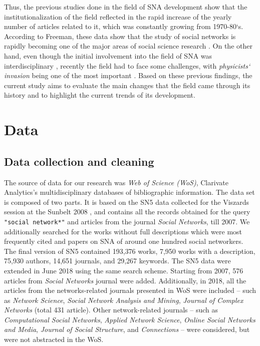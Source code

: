 \documentclass[11pt]{article} %
\begin{document}
Thus, the previous studies done in the field of SNA development show that the institutionalization of the field reflected in the rapid increase of the yearly number of articles related to it, which was constantly growing from 1970-80`s. According to Freeman, these data show that the study of social networks is rapidly becoming one of the major areas of social science research  \citep{SNAdev}. On the other hand, even though the initial involvement into the field of SNA was interdisciplinary \citep{normSci}, recently the field had to face  some challenges, with  \textit{physicists` invasion} being one of the most important \citep{lazer,brandes,Understand, SNAdev2}. Based on these previous findings, the current study aims to evaluate the main changes that the field came through its history and to highlight the current trends of its development. \medskip


\section{Data}

\subsection{Data collection and cleaning}

The source of data for our research was \textit{Web of Science (WoS)}, Clarivate Analytics’s multidisciplinary databases of bibliographic information. The data set is composed of two parts. It is based on the  SN5 data collected for the Viszards session at the Sunbelt 2008 \citep{Understand}, and contains all the records obtained for the query  \texttt {"social network*"} and articles from the journal \textit{Social Networks}, till 2007. We additionally searched for the works without full descriptions which were most frequently cited and papers on SNA of around one hundred social networkers. The final version of SN5 contained 193,376 works,  7,950 works with a description,  75,930 authors,  14,651 journals, and  29,267 keywords. The SN5 data were extended  in June 2018 using the same search scheme. Starting from 2007, 576 articles from \textit{Social Networks} journal were added. Additionally, in 2018, all the articles from the networks-related journals presented in WoS were included -- such as \textit{Network Science}, \textit{Social Network Analysis and Mining}, \textit{Journal of Complex  Networks} (total 431 article). Other network-related journals -- such as  \textit{Computational Social Networks}, \textit{Applied Network Science}, \textit{Online Social Networks and Media},  \textit{Journal of Social Structure}, and \textit{Connections} -- were considered, but were not abstracted in the WoS. \medskip
\end{document}
